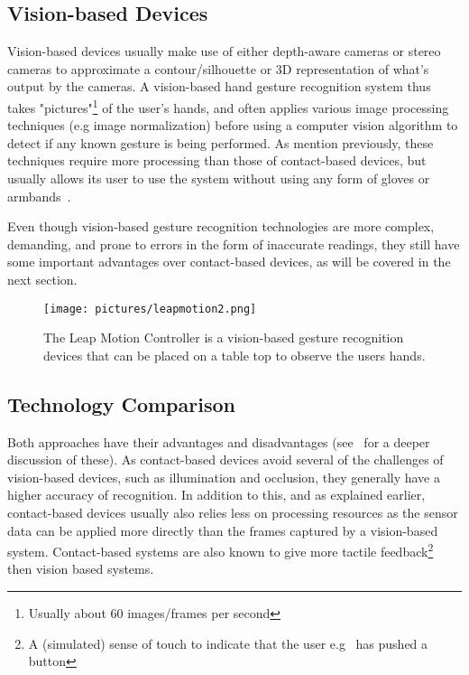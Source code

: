 \subsection{Vision-based Devices} 
Vision-based devices usually make use of either depth-aware cameras or stereo cameras to approximate a contour/silhouette or 
3D representation of what's output by the cameras. A vision-based hand gesture recognition system thus takes "pictures"\footnote{Usually about 60 images/frames per second} of the 
user's hands, and often applies various image processing techniques (e.g image normalization) before using a computer vision algorithm to detect if any known gesture is 
being performed. As mention previously, these techniques require more processing than those of contact-based devices, but usually allows its user to use the system
without using any form of gloves or armbands~\citep{Rautaray2015}. 

Even though vision-based gesture recognition technologies are more complex, demanding, and prone to 
errors in the form of inaccurate readings, they still have some important advantages over contact-based devices, as will be covered in the next section.

\begin{figure}%
	\texttt{[image: pictures/leapmotion2.png]}
	\caption[The Leap Motion Controller]{The Leap Motion Controller is a vision-based gesture recognition devices that can be placed on a table top to observe the users hands.}
	\label{fig:leapmotion}
\end{figure} 


\subsection{Technology Comparison}
Both approaches have their advantages and disadvantages (see~\citet{Rautaray2015} for a deeper discussion of these). 
As contact-based devices avoid several of the challenges of vision-based devices, such as illumination and occlusion, they generally have a higher accuracy of recognition.
In addition to this, and as explained earlier, contact-based devices usually also relies less on processing resources as the sensor data can be applied more directly than the
frames captured by a vision-based system. Contact-based systems are also known to give more tactile feedback\footnote{A (simulated) sense of touch to indicate that the user e.g~
has pushed a button} then vision based systems.

